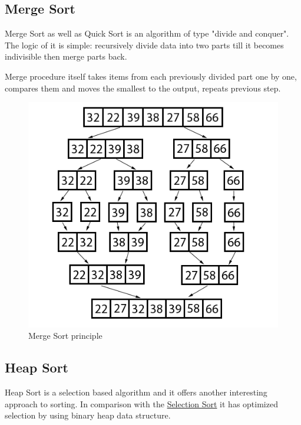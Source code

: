 \documentclass[
  field=inf,
  biblatex,
  language=english,
  glossaries,
  index
]{kidiplom}
\begin{document}
\subsection{Merge Sort}

Merge Sort as well as Quick Sort is an algorithm of type "divide and conquer". The logic of it is simple: recursively divide data into two parts till it becomes indivisible then merge parts back.

Merge procedure itself takes items from each previously divided part one by one, compares them and moves the smallest to the output, repeats previous step.

\begin{figure}[H]
\begin{center}
	
	\includegraphics[scale=2.5]{img/Mergesort.png}
	\caption{Merge Sort principle}\label{fig:insert}
\end{center}
\end{figure}

\subsection{Heap Sort}

Heap Sort is a selection based algorithm and it offers another interesting approach to sorting. In comparison with the \hyperref[sec:selection]{Selection Sort} it has optimized selection by using binary heap data structure. 
\end{document}
